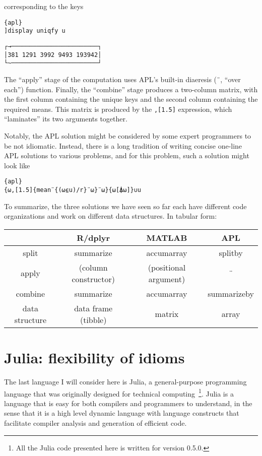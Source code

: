 \documentclass[11pt]{asaproc}
\begin{document}
corresponding to the keys

\begin{lstlisting}{apl}
]display uniqfy u
\end{lstlisting}
\begin{verbatim}
┌→────────────────────────┐
│381 1291 3992 9493 193942│
└~────────────────────────┘
\end{verbatim}

The ``apply'' stage of the computation uses APL's built-in diaeresis
(\lstinline|¨|, ``over each'') function. Finally, the ``combine'' stage
produces a two-column matrix, with the first column containing the unique keys
and the second column containing the required means. This matrix is produced by
the \lstinline|,[1.5]| expression, which ``laminates'' its two arguments
together.

Notably, the APL solution might be considered by some expert programmers to be
not idiomatic. Instead, there is a long tradition of writing concise one-line
APL solutions to various problems, and for this problem, such a solution might
look like

\begin{lstlisting}{apl}
{⍵,[1.5]{mean¨{(⍵⍷u)/r}¨⍵}¨⍵}{⍵[⍋⍵]}∪u
\end{lstlisting}

To summarize, the three solutions we have seen so far each have different code
organizations and work on different data structures. In tabular form:

\begin{tabular}{c|ccc}
 & R/dplyr & MATLAB & APL\tabularnewline
\hline
split & summarize & accumarray & splitby\tabularnewline
apply & (column constructor) & (positional argument) & ¨\tabularnewline
combine & summarize & accumarray & summarizeby\tabularnewline
data structure & data frame (tibble) & matrix & array\tabularnewline
\end{tabular}


\section{Julia: flexibility of idioms}

The last language I will consider here is Julia, a general-purpose programming
language that was originally designed for technical
computing~\citep{Bezanson2015}\footnote{All the Julia code presented here is
written for version 0.5.0.}. Julia is a language that is easy for both
compilers and programmers to understand, in the sense that it is a high level
dynamic language with language constructs that facilitate compiler analysis and
generation of efficient code.
\end{document}
